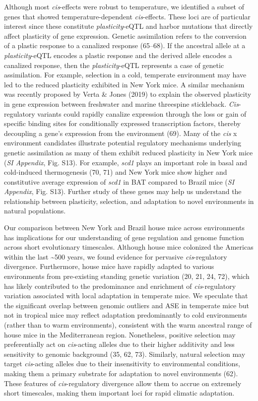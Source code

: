 \documentclass[9pt,twocolumn,twoside,lineno]{pnas-new}
\begin{document}
Although most \emph{cis}-effects were robust to temperature, we
identified a subset of genes that showed temperature-dependent
\emph{cis}-effects. These loci are of particular interest since these
constitute \emph{plasticity}-eQTL and harbor mutations that directly
affect plasticity of gene expression. Genetic assimilation refers to the
conversion of a plastic response to a canalized response (65--68). If
the ancestral allele at a \emph{plasticity}-eQTL encodes a plastic
response and the derived allele encodes a canalized response, then the
\emph{plasticity}-eQTL represents a case of genetic assimilation. For
example, selection in a cold, temperate environment may have led to the
reduced plasticity exhibited in New York mice. A similar mechanism was
recently proposed by Verta \& Jones (2019) to explain the observed
plasticity in gene expression between freshwater and marine threespine
stickleback. \emph{Cis}-regulatory variants could rapidly canalize
expression through the loss or gain of specific binding sites for
conditionally expressed transcription factors, thereby decoupling a
gene's expression from the environment (69). Many of the \emph{cis} x
environment candidates illustrate potential regulatory mechanisms
underlying genetic assimilation as many of them exhibit reduced
plasticity in New York mice (\emph{SI Appendix}, Fig. S13). For example,
\emph{scd1} plays an important role in basal and cold-induced
thermogenesis (70, 71) and New York mice show higher and constitutive
average expression of \emph{scd1} in BAT compared to Brazil mice
(\emph{SI Appendix}, Fig. S13). Further study of these genes may help us
understand the relationship between plasticity, selection, and
adaptation to novel environments in natural populations.

Our comparison between New York and Brazil house mice across
environments has implications for our understanding of gene regulation
and genome function across short evolutionary timescales. Although house
mice colonized the Americas within the last \textasciitilde500 years, we
found evidence for pervasive \emph{cis}-regulatory divergence.
Furthermore, house mice have rapidly adapted to various environments
from pre-existing standing genetic variation (20, 21, 24, 72), which has
likely contributed to the predominance and enrichment of
\emph{cis}-regulatory variation associated with local adaptation in
temperate mice. We speculate that the significant overlap between
genomic outliers and ASE in temperate mice but not in tropical mice may
reflect adaptation predominantly to cold environments (rather than to
warm environments), consistent with the warm ancestral range of house
mice in the Mediterranean region. Nonetheless, positive selection may
preferentially act on \emph{cis}-acting alleles due to their higher
additivity and less sensitivity to genomic background (35, 62, 73).
Similarly, natural selection may target \emph{cis}-acting alleles due to
their insensitivity to environmental conditions, making them a primary
substrate for adaptation to novel environments (62). These features of
\emph{cis}-regulatory divergence allow them to accrue on extremely short
timescales, making them important loci for rapid climatic adaptation.
\end{document}

